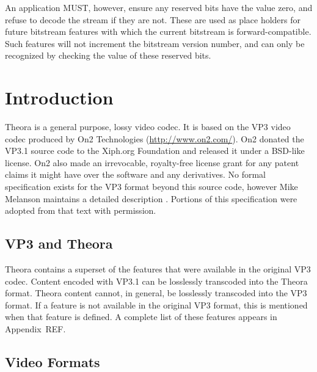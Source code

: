 \documentclass[11pt,letterpaper]{book}
\numberwithin{equation}{chapter}
\numberwithin{figure}{chapter}
\numberwithin{table}{chapter}
\begin{document}
An application MUST, however, ensure any reserved bits have the value zero, and
 refuse to decode the stream if they are not.
These are used as place holders for future bitstream features with which the
 current bitstream is forward-compatible.
Such features will not increment the bitstream version number, and can only be
 recognized by checking the value of these reserved bits.

\cleardoublepage



\mainmatter

\setcounter{page}{1}

\chapter{Introduction}

Theora is a general purpose, lossy video codec.
It is based on the VP3 video codec produced by On2 Technologies
 (\url{http://www.on2.com/}).
On2 donated the VP3.1 source code to the Xiph.org Foundation and released it
 under a BSD-like license.
On2 also made an irrevocable, royalty-free license grant for any patent claims
 it might have over the software and any derivatives.
No formal specification exists for the VP3 format beyond this source code,
 however Mike Melanson maintains a detailed description \cite{Mel04}.
Portions of this specification were adopted from that text with permission.

\section{VP3 and Theora}

Theora contains a superset of the features that were available in the original
 VP3 codec.
Content encoded with VP3.1 can be losslessly transcoded into the Theora format.
Theora content cannot, in general, be losslessly transcoded into the VP3
 format.
If a feature is not available in the original VP3 format, this is mentioned
 when that feature is defined.
A complete list of these features appears in Appendix~REF.


\section{Video Formats}
\end{document}
